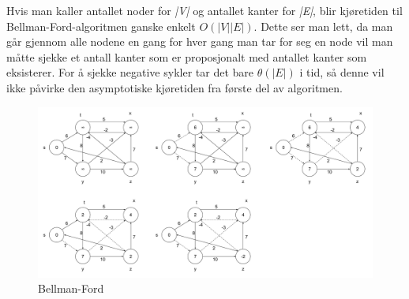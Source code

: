 \noindent Hvis man kaller antallet noder for \textit{|V|} og antallet kanter for \textit{|E|}, blir kjøretiden til Bellman-Ford-algoritmen ganske enkelt $O(|V||E|)$. Dette ser man lett, da man går gjennom alle nodene en gang for hver gang man tar for seg en node vil man måtte sjekke et antall kanter som er proposjonalt med antallet kanter som eksisterer. For å sjekke negative sykler tar det bare $\theta(|E|)$ i tid, så denne vil ikke påvirke den asymptotiske kjøretiden fra første del av algoritmen.

\begin{figure}[H]
\includegraphics[scale=0.3]{images/bellman-ford}
\centering %
\caption{Bellman-Ford}
\label{fig:bellman-ford}
\end{figure}

